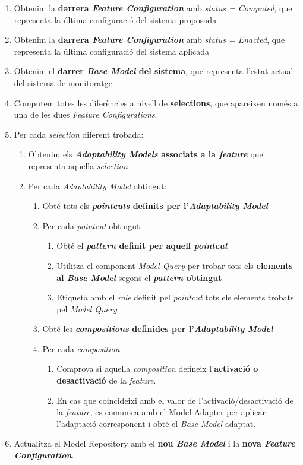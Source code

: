 \begin{enumerate}
\item Obtenim la \textbf{darrera \textit{Feature Configuration}} amb \textit{status = Computed}, que representa la última configuració del sistema proposada
\item Obtenim la \textbf{darrera \textit{Feature Configuration}} amb \textit{status = Enacted}, que representa la última configuració del sistema aplicada
\item Obtenim el \textbf{darrer \textit{Base Model} del sistema}, que representa l'estat actual del sistema de monitoratge
\item Computem totes les diferències a nivell de \textbf{selections}, que apareixen només a una de les dues \textit{Feature Configurations}.
\item Per cada \textit{selection} diferent trobada:
\begin{enumerate}
\item Obtenim els \textbf{\textit{Adaptability Models} associats a la \textit{feature}} que representa aquella \textit{selection}
\item Per cada \textit{Adaptability Model} obtingut:
\begin{enumerate}
\item Obté tots els \textbf{\textit{pointcuts} definits per l'\textit{Adaptability Model}}
\item Per cada \textit{pointcut} obtingut:
\begin{enumerate}
\item Obté el \textbf{\textit{pattern} definit per aquell \textit{pointcut}}
\item Utilitza el component \textit{Model Query} per trobar tots els \textbf{elements al \textit{Base Model}} segons el \textbf{\textit{pattern} obtingut}
\item Etiqueta amb el \textit{role} definit pel \textit{pointcut} tots els elements trobats pel \textit{Model Query}
\end{enumerate}
\item Obté les \textbf{\textit{compositions} definides per l'\textit{Adaptability Model}}
\item Per cada \textit{composition}:
\begin{enumerate}
\item Comprova si aquella \textit{composition} defineix l'\textbf{activació o desactivació} de la \textit{feature}. 
\item En cas que coincideixi amb el valor de l'activació/desactivació de la \textit{feature}, es comunica amb el Model Adapter per aplicar l'adaptació corresponent i obté el \textit{Base Model} adaptat.
\end{enumerate}
\end{enumerate}
\end{enumerate}
\item Actualitza el Model Repository amb el \textbf{nou \textit{Base Model}} i la \textbf{nova \textit{Feature Configuration}}.
\end{enumerate}

